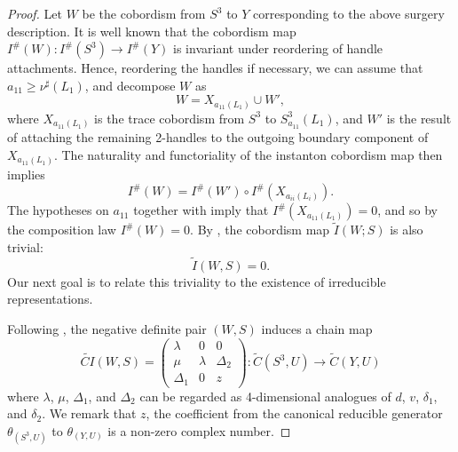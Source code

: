 \documentclass[11pt]{amsart}
\begin{document}
\begin{proof}
Let $W$ be the cobordism from $S^3$ to $Y$ corresponding to the above surgery description. It is well known that the cobordism map $I^\# (W) \colon I^\# (S^3) \to I^\#(Y)$ is invariant under reordering of handle attachments. Hence, reordering the handles if necessary, we can assume that $a_{11}\geq\nu^\sharp(L_1)$, and decompose $W$ as 
\[
W = X_{a_{11}(L_1)}\cup W',
\]
where $X_{a_{11}(L_1)}$ is the trace cobordism from $S^3$ to $S^3_{a_{11}}(L_1)$, and $W'$ is the result of attaching the remaining 2-handles to the outgoing boundary component of $X_{a_{11}(L_1)}$. The naturality and functoriality of the instanton cobordism map then implies
\[
I^{\#}(W) = I^{\#}(W')\circ I^{\#}(X_{a_{ii}(L_i)}).
\]
The hypotheses on $a_{11}$ together with  imply that $I^\#(X_{a_{11}(L_1)})=0$, and so by the composition law $I^{\#}(W)=0$. By , the cobordism map $\widetilde{I}(W; S)$ is also trivial:
\begin{equation}\label{eq: I-tilde is trivial}
	\tilde{I}(W,S)= 0.
\end{equation}
Our next goal is to relate this triviality to the existence of irreducible representations. 

Following \cite[Section 3]{DS-singular}, the negative definite pair $(W,S)$ induces a chain map
\begin{equation}\label{eq: cobordism map in equivariant singular instanton Floer homology}
	\widetilde{CI}(W,S) = \left(
	\begin{matrix}
		\lambda & 0 & 0\\
		\mu & \lambda & \Delta_2\\
		\Delta_1 & 0 & z
	\end{matrix}
\right): \widetilde{C}(S^3,U)\to \widetilde{C}(Y,U)
\end{equation}
where $\lambda$, $\mu$, $\Delta_1$, and $\Delta_2$ can be regarded as 4-dimensional analogues of $d$, $v$, $\delta_1$, and $\delta_2$. We remark that $z$, the coefficient from the canonical reducible generator $\theta_{(S^3,U)}$ to $\theta_{(Y,U)}$ is a non-zero complex number.


\end{proof}
\end{document}
